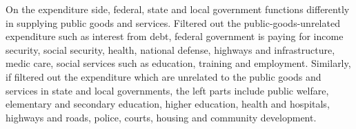 On the expenditure side, federal, state and local government functions differently in supplying public goods and services. Filtered out the public-goods-unrelated expenditure such as interest from debt, federal government is paying for income security, social security, health, national defense, highways and infrastructure, medic care, social services such as education, training and employment. Similarly, if filtered out the expenditure which are unrelated to the public goods and services in state and local governments, the left parts include public welfare, elementary and secondary education, higher education, health and hospitals, highways and roads, police, courts, housing and community development.
\begin{figure}[H]
    \centering  %


\end{figure}
